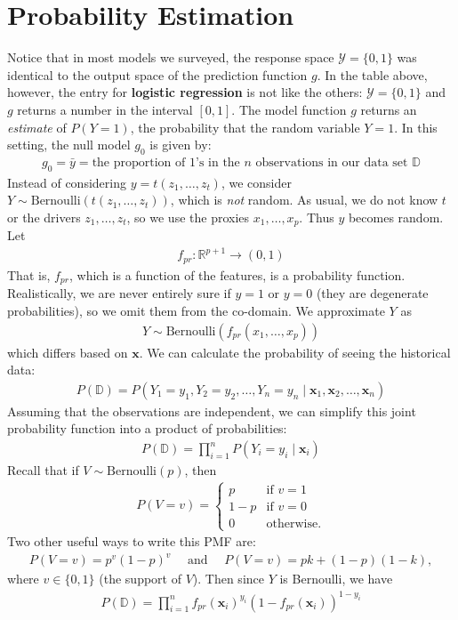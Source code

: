 \documentclass[12pt, a4paper]{article}
\theoremstyle{definition}
\begin{document}
	\section*{Probability Estimation}
	Notice that in most models we surveyed, the response space $\mathcal{Y}=\{0,1\}$ was identical
	to the output space of the prediction function $g$. In the table above, however,
	the entry for \textbf{logistic regression} is not like the others: $\mathcal{Y}=\{0,1\}$
	and $g$ returns a number in the interval $[0,1]$. The model function $g$ returns an
	\textit{estimate} of $P(Y=1)$, the probability that the random variable $Y=1$. In this setting,
	the null model $g_0$ is given by:
	\begin{align*}
		g_0 = \bar{y} = \text{the proportion of $1$'s in the $n$ observations
			in our data set $\mathbb{D}$}
	\end{align*}
	Instead of considering $y=t(z_1,\ldots,z_t)$, we consider
	$Y\sim \text{Bernoulli}(t(z_1,\ldots,z_t))$, which is \textit{not} random.
	As usual, we do not know $t$ or the drivers $z_1,\ldots,z_t$, so we use the proxies
	$x_1,\ldots,x_p$. Thus $y$ becomes random. Let
	\begin{align*}
		f_{pr}:\mathbb{R}^{p+1}\to (0, 1)
	\end{align*}
	That is, $f_{pr}$, which is a function of the features, is a probability function.
	Realistically, we are never entirely sure if $y=1$ or $y=0$ (they are degenerate probabilities),
	so we omit them from the co-domain. We approximate $Y$ as
	\begin{align*}
		Y \sim \text{Bernoulli}(f_{pr}(x_1,\ldots,x_p))
	\end{align*}
	which differs based on $\bm{x}$. We can calculate the probability of seeing the historical
	data:
	\begin{align*}
		P(\mathbb{D}) = P(Y_1=y_1, Y_2=y_2,\ldots,Y_n=y_n\mid \bm{x}_1,\bm{x}_2,\ldots,\bm{x}_n)
	\end{align*}
	Assuming that the observations are independent, we can simplify this joint
	probability function into a product of probabilities:
	\begin{align*}
		P(\mathbb{D}) = \prod_{i=1}^{n}P(Y_i=y_i \mid \bm{x}_i)
	\end{align*}
	Recall that if $V\sim \text{Bernoulli}(p)$, then
	\begin{align*}
		P(V = v) = \begin{cases}
			p & \text{if } v = 1\\
			1-  p & \text{if } v = 0\\
			0 & \text{otherwise.}
		\end{cases}
	\end{align*}
	Two other useful ways to write this PMF are:
	\begin{align*}
		P(V=v) = p^v(1-p)^v\quad \text{ and } \quad P(V=v) = pk + (1 - p)(1-k),
	\end{align*}
	where $v\in \{0, 1\}$ (the support of $V$). Then since $Y$ is Bernoulli, we have
	\begin{align*}
		P(\mathbb{D}) = \prod_{i=1}^{n}f_{pr}(\bm{x}_i)^{y_i}(1 - f_{pr}(\bm{x}_i))^{1-y_i}
	\end{align*}
\end{document}
